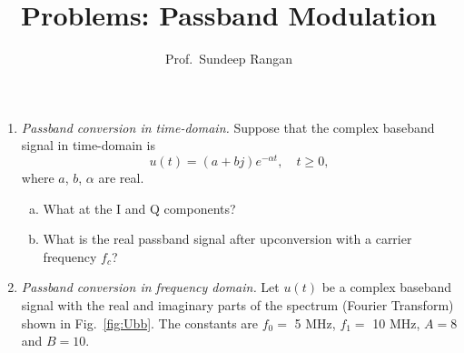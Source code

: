 \documentclass[11pt]{article}
\def\Real{\mathrm{Re}}
\begin{document}
\title{Problems:  Passband Modulation}
\author{Prof.\ Sundeep Rangan}
\date{}

\maketitle

\begin{enumerate}


\item \emph{Passband conversion in time-domain.}  Suppose that the
complex baseband signal in time-domain is
\[
    u(t) = (a+bj)e^{-\alpha t}, \quad t \geq 0,
\]
where $a$, $b$, $\alpha$ are real.
\begin{enumerate}[(a)]
  \item What at the I and Q components?
  \item What is the real passband signal after upconversion with a carrier frequency $f_c$?
\end{enumerate}

\item \emph{Passband conversion in frequency domain.}
Let $u(t)$ be a complex baseband signal with the real and imaginary parts of
 the spectrum (Fourier Transform) shown in
Fig.~\ref{fig:Ubb}.  The constants are $f_0 = $ 5 MHz, $f_1 = $ 10 MHz, $A=8$ and $B=10$.

\begin{figure}[h]
\center
{}

\end{figure}
\end{enumerate}
\end{document}
